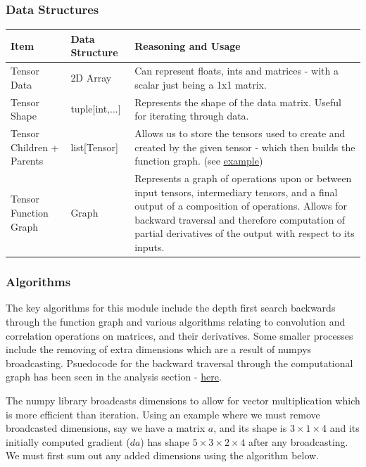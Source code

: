 \documentclass{article}
\makeatletter
\newcommand\subsubsubsection{\@startsection{paragraph}{4}{\z@}{-2.5ex\@plus -1ex \@minus -.25ex}{1.25ex \@plus .25ex}{\normalfont\normalsize\bfseries}}
\newcommand{\myhy}[2]{\hyperref[#1]{\color{black}\setulcolor{black}\ul{#2}}}
\makeatother
\begin{document}
    \subsubsection{Data Structures}

    \begin{center}
        \begin{tabular}{|m{10em} | m{12em} | m{15em}|}
            \hline 
                Item & Data Structure & Reasoning and Usage \\
            \hline
            \hline
                Tensor Data & 2D Array & Can represent floats, ints and matrices - with a scalar just being a 1x1 matrix. \\
            \hline
                Tensor Shape & tuple[int,...] & Represents the shape of the data matrix. Useful for iterating through data. \\
            \hline
                Tensor Children + Parents & list[Tensor] & Allows us to store the tensors used to create and created by the given tensor - which then builds the function graph. (see \myhy{Autodiff-example}{example}) \\
            \hline
                Tensor Function Graph & Graph & Represents a graph of operations upon or between input tensors, intermediary tensors, and a final output of a composition of operations. Allows for
                backward traversal and therefore computation of partial derivatives of the output with respect to its inputs. \\
            \hline
        \end{tabular}
    \end{center}

    \subsubsection{Algorithms}

    The key algorithms for this module include the depth first search backwards through the function graph and various algorithms relating to convolution
    and correlation operations on matrices, and their derivatives. Some smaller processes include the removing of extra dimensions which are a result of numpys broadcasting.
    Psuedocode for the backward traversal through the computational graph has been seen in the analysis section - \myhy{Analysis-IoA}{here}.

    \subsubsubsection{Unbroadcasting}  
    The numpy library broadcasts dimensions to allow for vector multiplication which is more efficient than iteration.
    Using an example where we must remove broadcasted dimensions, say we have a matrix $a$, and its shape is $3 \times 1 \times 4$ and its initially computed
    gradient ($da$) has shape $5 \times 3 \times 2 \times 4$ after any broadcasting. We must first sum out any added dimensions using the algorithm below.
\end{document}
